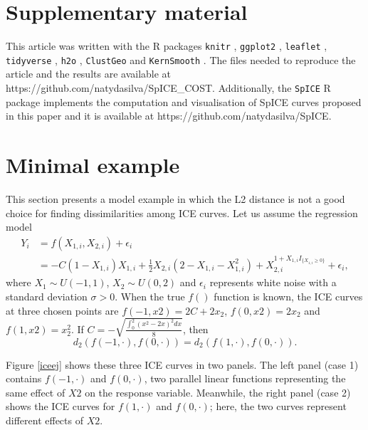 \documentclass[smallextended,natbib]{svjour3}\usepackage[]{graphicx}\usepackage[]{xcolor}
\newcommand{\1}[1]{\mathbbm{1}_{#1}}
\begin{document}
\section{ Supplementary material }
This article was written with the R packages \texttt{knitr} \citep{knitr}, \texttt{ggplot2} \citep{hadley:2016}, \texttt{leaflet} \citep{leaflet}, \texttt{tidyverse} \citep{tidyverse}, \texttt{h2o} \citep{h2o}, \texttt{ClustGeo} \citep{clustGeo} and
 \texttt{KernSmooth} \citep{KernSmooth}. The files needed to reproduce the article and the results are available at https://github.com/natydasilva/SpICE\_COST. Additionally, the \texttt{SpICE} R package implements the computation and visualisation of SpICE curves proposed in this paper and  it is available at  https://github.com/natydasilva/SpICE. 











\appendix

\section{Minimal example \label{toyexample}}  
This section presents a model example in which the L2 distance is not a good choice for finding dissimilarities among ICE curves. Let us assume the regression model 
\[\begin{array}{cl}
  Y_i   &  = f(X_{1,i}, X_{2,i}) + \epsilon_i  \\
     & = -C(1-X_{1,i})X_{1,i} + \frac{1}{2}X_{2,i}(2- X_{1,i}-X^2_{1,i}) +X_{2,i}^{1+X_{1,i} I_{ \{X_{1,i}\geq 0\} } }  + \epsilon_i,
\end{array}\]
where $X_1 \sim U(-1,1)$, $X_2\sim U(0,2)$ and $\epsilon_i$ represents white noise with a standard deviation $\sigma>0$. When the true $f()$ function is known, the ICE curves at three chosen points are $f(-1,x2)= 2C+2x_2$, $f(0,x2)=2x_2$ and $f(1,x2)=x_2^2$. If $C= -\sqrt{ \frac{\int_0^2(x^2-2x)^2 dx}{8}}$, then 
$$d_2\left( f(-1,\cdot), f(0,\cdot)\right)= d_2\left( f(1,\cdot), f(0,\cdot)\right).$$

Figure \ref{iceej} shows these three ICE curves in two panels. The left panel (case 1) contains $f(-1,\cdot)$ and $f(0,\cdot)$, two parallel linear functions representing the same effect of $X2$ on the response variable. Meanwhile, the right panel (case 2) shows the ICE curves for $f(1,\cdot)$ and $f(0,\cdot)$; here, the two curves represent different effects of $X2$. 
\end{document}
